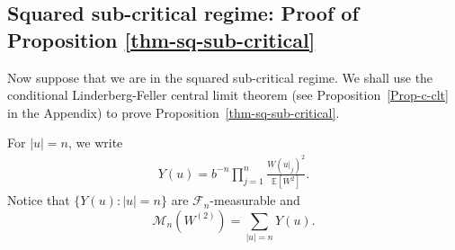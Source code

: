 \documentclass[12pt]{amsart}
\theoremstyle{definition}
\theoremstyle{remark}
\newcommand{\E}{\mathbb{E}}
\newcommand{\MAB}{\mathscr{M}_{n}(W^{(2)})}
\newcommand{\VU}{Y(u)}
\numberwithin{equation}{section}
\begin{document}
\subsection{Squared sub-critical regime: Proof of Proposition \ref{thm-sq-sub-critical}}



Now suppose that we are in the squared sub-critical regime.
We shall use the conditional  Linderberg-Feller central limit theorem   (see Proposition~\ref{Prop-c-clt} in the Appendix) to prove Proposition~\ref{thm-sq-sub-critical}.



For $|u|=n$,  we write
\begin{align}\label{eqn-yu-uuu}
\VU=b^{-n}\prod_{j=1}^{n} \frac{W(u|_j)^2}{\E[W^2]}.
\end{align}
Notice that $\{\VU: |u|=n\}$ are $\mathscr{F}_n$-measurable and
\[
\MAB=\sum_{|u|=n}\VU.
\]
\end{document}
